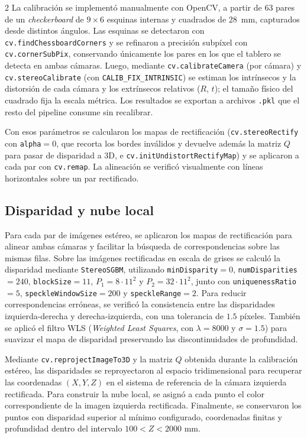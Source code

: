 \documentclass[10pt,a4paper]{article}
\begin{document}
\begin{multicols}{2}
La calibración se implementó manualmente con OpenCV, a partir de 63
pares de un \emph{checkerboard} de $9\times6$ esquinas internas y cuadrados de 28~mm, capturados
desde distintos ángulos. Las esquinas se detectaron con \texttt{cv.findChessboardCorners} y se
refinaron a precisión subpíxel con \texttt{cv.cornerSubPix}, conservando únicamente los pares en
los que el tablero se detecta en ambas cámaras. Luego, mediante \texttt{cv.calibrateCamera} (por
cámara) y \texttt{cv.stereoCalibrate} (con \texttt{CALIB\_FIX\_INTRINSIC}) se estiman los
intrínsecos y la distorsión de cada cámara y los extrínsecos relativos ($R$, $t$); el tamaño físico
del cuadrado fija la escala métrica. Los resultados se exportan a archivos \texttt{.pkl} que el resto
del pipeline consume sin recalibrar.

Con esos parámetros se calcularon los mapas de rectificación (\texttt{cv.stereoRectify} con
\texttt{alpha}$=0$, que recorta los bordes inválidos y devuelve además la matriz $Q$ para
pasar de disparidad a 3D, e \texttt{cv.initUndistortRectifyMap}) y se
aplicaron a cada par con \texttt{cv.remap}. La alineación se verificó visualmente con líneas horizontales 
sobre un par rectificado.

\subsection{Disparidad y nube local}
Para cada par de imágenes estéreo, se aplicaron los mapas de rectificación para alinear ambas cámaras y 
facilitar la búsqueda de correspondencias sobre las mismas filas. Sobre las imágenes rectificadas en escala 
de grises se calculó la disparidad mediante \texttt{StereoSGBM}, utilizando \texttt{minDisparity}$=0$,
\texttt{numDisparities}$=240$, \texttt{blockSize}$=11$, $P_1=8\cdot11^2$ y $P_2=32\cdot11^2$, junto con \texttt{uniquenessRatio}$=5$,
\texttt{speckleWindowSize}$=200$ y \texttt{speckleRange}$=2$. Para reducir correspondencias erróneas, se verificó
la consistencia entre las disparidades izquierda-derecha y derecha-izquierda, con una tolerancia de $1.5$ píxeles.
También se aplicó el filtro WLS (\textit{Weighted Least Squares}, con $\lambda=8000$ y $\sigma=1.5$) para suavizar el mapa de disparidad preservando
las discontinuidades de profundidad.

Mediante \texttt{cv.reprojectImageTo3D} y la matriz $Q$ obtenida durante la calibración estéreo, las disparidades 
se reproyectaron al espacio tridimensional para recuperar las coordenadas $(X,Y,Z)$ en el sistema de referencia de 
la cámara izquierda rectificada. Para construir la nube local, se asignó a cada punto el color correspondiente de 
la imagen izquierda rectificada. Finalmente, se conservaron los puntos con disparidad superior al mínimo configurado, 
coordenadas finitas y profundidad dentro del intervalo $100<Z<2000$ mm.


\end{multicols}
\end{document}
